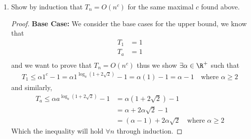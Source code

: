 \documentclass[12pt]{article}
\theoremstyle{definition}
\theoremstyle{remark}
\begin{document}
\begin{enumerate}
\begin{enumerate}
\begin{proof}
By quadratic formula, 
\begin{align*}
    x &\ge \frac{2 \pm \sqrt{{(-2)}^2 - 4(1)(-7)}}{2} \\
    &= \frac{2 \pm \sqrt{32}}{2} \\
    &= \frac{2 \pm 4\sqrt{2}}{2} \\
    &= 1 \pm 2\sqrt{2} \\
\end{align*}

Since we know that $x > 0$, we take the positive $x$ from the quadratic formula. Therefore,
\begin{align*}
    x &= a^c = 1 + 2\sqrt{2} \\
    \log_{a}a^c &= \log_{a}(1 + 2\sqrt{2}) \\
    c &= \log_{a}(1 + 2\sqrt{2}) \\
\end{align*}

So we have found our $c$. 

\end{proof}
    \item Show by induction that $T_n = O(n^c)$ for the same maximal $c$ found above. 
    \begin{proof} 
      \textbf{Base Case: }
We consider the base cases for the upper bound, we know that 
\begin{align*}
    T_1 &= 1 \\
    T_a &= 1 \\
\end{align*}
and we want to prove that $T_n = O(n^c)$
thus we show $\exists \alpha \in \R^{+}$ such that 
\begin{align*}
    T_1 \le \alpha {1}^{c} - 1 = \alpha {1}^{\log_a (1 + 2\sqrt{2})} - 1 = \alpha (1) - 1 = \alpha - 1 \quad \text{where } \alpha \ge 2
\end{align*}
and similarly,
\begin{align*}
    T_a \le \alpha a^{\log_{a}(1 + 2\sqrt{2})} - 1 &= \alpha (1 + 2\sqrt{2}) - 1 \\
    &= \alpha + 2\alpha \sqrt{2} - 1 \\
    &= (\alpha - 1) + 2\alpha \sqrt{2} \quad \text{where } \alpha \ge 2
\end{align*}
Which the inequality will hold $\forall n$ through induction. 


\end{proof}
\end{enumerate}
\end{enumerate}
\end{document}
